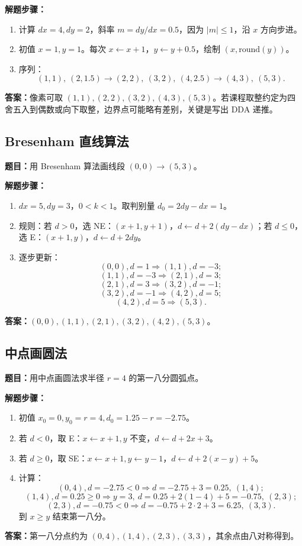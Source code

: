 \documentclass[UTF8,zihao=-4,scheme=chinese,fontset=fandol]{ctexart}
\begin{document}
\textbf{解题步骤：}
\begin{enumerate}
  \item 计算 $dx=4,dy=2$，斜率 $m=dy/dx=0.5$，因为 $|m|\le1$，沿 $x$ 方向步进。
  \item 初值 $x=1,y=1$。每次 $x\leftarrow x+1$，$y\leftarrow y+0.5$，绘制 $(x,\mathrm{round}(y))$。
  \item 序列：
  \[
  (1,1),\ (2,1.5)\to(2,2),\ (3,2),\ (4,2.5)\to(4,3),\ (5,3).
  \]
\end{enumerate}
\textbf{答案：}像素可取 $(1,1),(2,2),(3,2),(4,3),(5,3)$。若课程取整约定为四舍五入到偶数或向下取整，边界点可能略有差别，关键是写出 DDA 递推。

\subsection{Bresenham 直线算法}
\textbf{题目：}用 Bresenham 算法画线段 $(0,0)\to(5,3)$。

\textbf{解题步骤：}
\begin{enumerate}
  \item $dx=5,dy=3$，$0<k<1$。取判别量 $d_0=2dy-dx=1$。
  \item 规则：若 $d>0$，选 NE：$(x+1,y+1)$，$d\leftarrow d+2(dy-dx)$；若 $d\le0$，选 E：$(x+1,y)$，$d\leftarrow d+2dy$。
  \item 逐步更新：
  \[
  (0,0),d=1\Rightarrow(1,1),d=-3;
  \]
  \[
  (1,1),d=-3\Rightarrow(2,1),d=3;
  \]
  \[
  (2,1),d=3\Rightarrow(3,2),d=-1;
  \]
  \[
  (3,2),d=-1\Rightarrow(4,2),d=5;
  \]
  \[
  (4,2),d=5\Rightarrow(5,3).
  \]
\end{enumerate}
\textbf{答案：}$(0,0),(1,1),(2,1),(3,2),(4,2),(5,3)$。

\subsection{中点画圆法}
\textbf{题目：}用中点画圆法求半径 $r=4$ 的第一八分圆弧点。

\textbf{解题步骤：}
\begin{enumerate}
  \item 初值 $x_0=0,y_0=r=4,d_0=1.25-r=-2.75$。
  \item 若 $d<0$，取 E：$x\leftarrow x+1,y$ 不变，$d\leftarrow d+2x+3$。
  \item 若 $d\ge0$，取 SE：$x\leftarrow x+1,y\leftarrow y-1$，$d\leftarrow d+2(x-y)+5$。
  \item 计算：
  \[
  (0,4),d=-2.75<0\Rightarrow d=-2.75+3=0.25,\ (1,4);
  \]
  \[
  (1,4),d=0.25\ge0\Rightarrow y=3,\ d=0.25+2(1-4)+5=-0.75,\ (2,3);
  \]
  \[
  (2,3),d=-0.75<0\Rightarrow d=-0.75+2\cdot2+3=6.25,\ (3,3).
  \]
  到 $x\ge y$ 结束第一八分。
\end{enumerate}
\textbf{答案：}第一八分点约为 $(0,4),(1,4),(2,3),(3,3)$，其余点由八对称得到。
\end{document}
